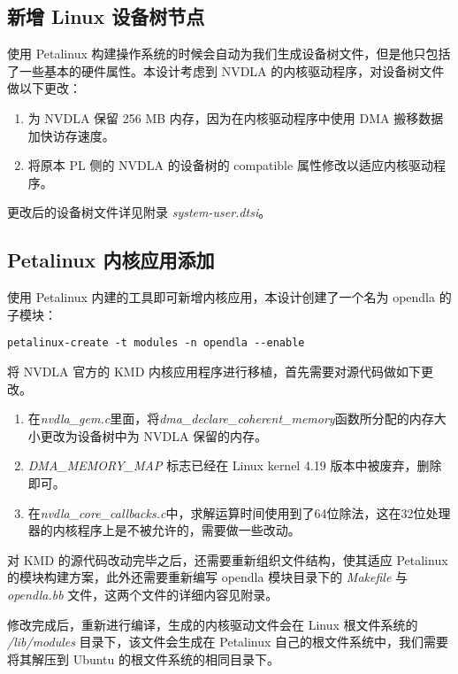 \subsection{新增 Linux 设备树节点}

使用 Petalinux 构建操作系统的时候会自动为我们生成设备树文件，但是他只包括了一些基本的硬件属性。本设计考虑到 NVDLA 的内核驱动程序，对设备树文件做以下更改：

\begin{enumerate}
    \item 为 NVDLA 保留 256 MB 内存，因为在内核驱动程序中使用 DMA 搬移数据加快访存速度。
    \item 将原本 PL 侧的 NVDLA 的设备树的 compatible 属性修改以适应内核驱动程序。
\end{enumerate}

更改后的设备树文件详见附录 \emph{system-user.dtsi}。

\subsection{Petalinux 内核应用添加}

使用 Petalinux 内建的工具即可新增内核应用，本设计创建了一个名为 opendla 的子模块：

\begin{lstlisting}
petalinux-create -t modules -n opendla --enable
\end{lstlisting}

将 NVDLA 官方的 KMD 内核应用程序进行移植，首先需要对源代码做如下更改。

\begin{enumerate}
    \item 在\emph{nvdla\_gem.c}里面，将\emph{dma\_declare\_coherent\_memory}函数所分配的内存大小更改为设备树中为 NVDLA 保留的内存。
    \item \emph{DMA\_MEMORY\_MAP } 标志已经在 Linux kernel 4.19 版本中被废弃，删除即可。
    \item 在\emph{nvdla\_core\_callbacks.c}中，求解运算时间使用到了64位除法，这在32位处理器的内核程序上是不被允许的，需要做一些改动。
\end{enumerate}

对 KMD 的源代码改动完毕之后，还需要重新组织文件结构，使其适应 Petalinux 的模块构建方案，此外还需要重新编写 opendla 模块目录下的 \emph{Makefile} 与 \emph{opendla.bb} 文件，这两个文件的详细内容见附录。

修改完成后，重新进行编译，生成的内核驱动文件会在 Linux 根文件系统的 \emph{/lib/modules} 目录下，该文件会生成在 Petalinux 自己的根文件系统中，我们需要将其解压到 Ubuntu 的根文件系统的相同目录下。

